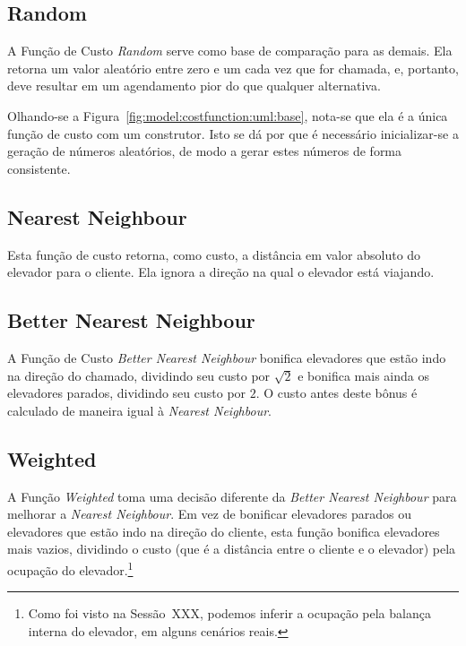 \subsection{\label{model:costfunctions:random}Random}
A Função de Custo \textit{Random} serve como base de comparação para as demais.
Ela retorna um valor aleatório entre zero e um cada vez que for chamada, e,
portanto, deve resultar em um agendamento pior do que qualquer alternativa.

Olhando-se a Figura~\ref{fig:model:costfunction:uml:base}, nota-se que ela é a
única função de custo com um construtor. Isto se dá por que é necessário
inicializar-se a geração de números aleatórios, de modo a gerar estes números de
forma consistente.

\subsection{\label{model:costfunctions:nn}Nearest Neighbour}
Esta função de custo retorna, como custo, a distância em valor absoluto do
elevador para o cliente. Ela ignora a direção na qual o elevador está viajando.


\subsection{\label{model:costfunctions:bnn}Better Nearest Neighbour}
A Função de Custo \textit{Better Nearest Neighbour} bonifica elevadores que
estão indo na direção do chamado, dividindo seu custo por $\sqrt 2$ e bonifica
mais ainda os elevadores parados, dividindo seu custo por $2$. O custo antes
deste bônus é calculado de maneira igual à \textit{Nearest Neighbour}.

\subsection{\label{model:costfunctions:weighted}Weighted}
A Função \textit{Weighted} toma uma decisão diferente da \textit{Better Nearest
  Neighbour} para melhorar a \textit{Nearest Neighbour}. Em vez de bonificar
elevadores parados ou elevadores que estão indo na direção do cliente, esta
função bonifica elevadores mais vazios, dividindo o custo (que é a distância
entre o cliente e o elevador) pela ocupação do elevador.\footnote{Como foi visto
na Sessão~XXX, podemos inferir a ocupação pela balança interna do elevador, em
alguns cenários reais.}

